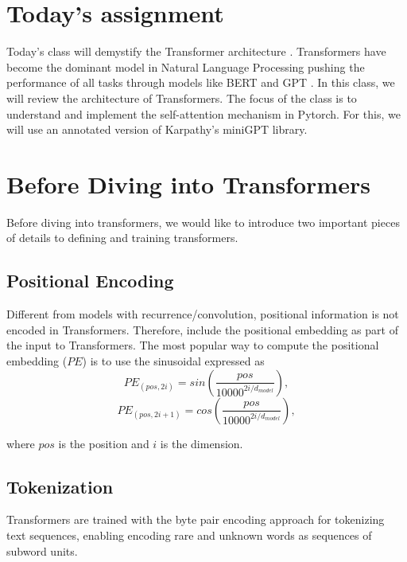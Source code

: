 \section{Today's assignment}
Today's class will demystify the Transformer architecture \cite{vaswani2017attention}. Transformers have become the dominant model in Natural Language Processing pushing the performance of all tasks through models like BERT \cite{devlin2018bert} and GPT \cite{brown2020language}. In this class, we will review the architecture of Transformers. The focus of the class is to understand and implement the self-attention mechanism in Pytorch. For this, we will use an annotated version of Karpathy's miniGPT library.


\section{Before Diving into Transformers}
Before diving into transformers, we would like to introduce two important pieces of details to defining and training transformers.


\subsection{Positional Encoding}
Different from models with recurrence/convolution, positional information is not encoded in Transformers. Therefore, \citet{vaswani2017attention} include the positional embedding as part of the input to Transformers. The most popular way to compute the positional embedding ($PE$) is to use the sinusoidal expressed as
\begin{equation}
        PE_{(pos,2i)} = sin(\frac{pos}{ 10000^{2i/d_{model}}}),
\end{equation}
\begin{equation}
    PE_{(pos,2i+1)} = cos(\frac{pos}{ 10000^{2i/d_{model}}}),
\end{equation}

where $pos$ is the position and $i$ is the dimension.

\subsection{Tokenization}
Transformers are trained with the byte pair encoding \citep{bpe} approach for tokenizing text sequences, enabling encoding rare and unknown words as sequences of subword units.

